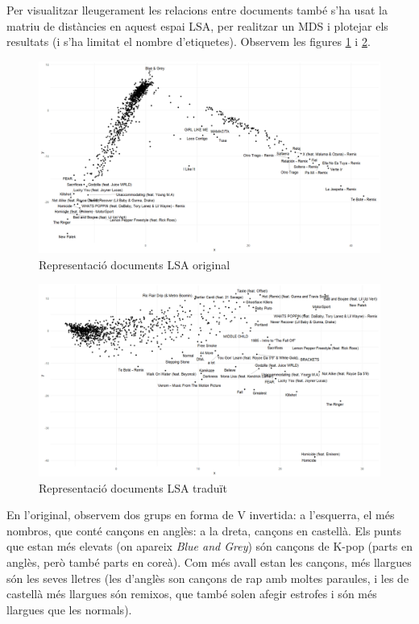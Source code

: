 Per visualitzar lleugerament les relacions entre documents també s'ha usat la matriu de distàncies en aquest espai LSA, per realitzar un MDS i plotejar els resultats (i s'ha limitat el nombre d'etiquetes). Observem les figures \ref{fig:textual_lsa_dist_orig} i \ref{fig:textual_lsa_dist_trad}.

\begin{figure}[H]
    \centering
    \includegraphics[width=0.8\linewidth]{Images//8_Textual//LSA/original_distances_outliers.png}
    \caption{Representació documents LSA original}
    \label{fig:textual_lsa_dist_orig}
\end{figure}

\begin{figure}[H]
    \centering
    \includegraphics[width=0.8\linewidth]{Images//8_Textual//LSA/distances_outliers.png}
    \caption{Representació documents LSA traduït}
    \label{fig:textual_lsa_dist_trad}
\end{figure}

En l'original, observem dos grups en forma de V invertida: a l'esquerra, el més nombros, que conté cançons en anglès: a la dreta, cançons en castellà. Els punts que estan més elevats (on apareix \textit{Blue and Grey}) són cançons de K-pop (parts en anglès, però també parts en coreà). Com més avall estan les cançons, més llargues són les seves lletres (les d'anglès son cançons de rap amb moltes paraules, i les de castellà més llargues són remixos, que també solen afegir estrofes i són més llargues que les normals). 

